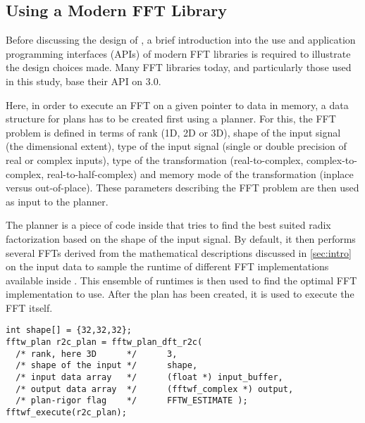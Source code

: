 \subsection{Using a Modern FFT Library}
\label{ssec:modern_ffts}
Before discussing the design of \gearshifft{}, a brief introduction into the use and application programming interfaces (APIs) of modern FFT libraries is required to illustrate the design choices made. Many FFT libraries today, and particularly those used in this study, base their API on \fftw{} $3.0$. 

Here, in order to execute an FFT on a given pointer to data in memory, a data structure for plans has to be created first using a planner. For this, the FFT problem is defined in terms of rank (1D, 2D or 3D), shape of the input signal (the dimensional extent), type of the input signal (single or double precision of real or complex inputs), type of the transformation (real-to-complex, complex-to-complex, real-to-half-complex) and memory mode of the transformation (inplace versus out-of-place). These parameters describing the FFT problem are then used as input to the planner. 

The planner is a piece of code inside \fftw{} that tries to find the best suited radix factorization based on the shape of the input signal. By default, it then performs several FFTs derived from the mathematical descriptions discussed in \cref{sec:intro} on the input data to sample the runtime of different FFT implementations available inside \fftw{}. This ensemble of runtimes is then used to find the optimal FFT implementation to use. After the plan has been created, it is used to execute the FFT itself.

\begin{lstlisting}[caption={Minimal usage example of the \fftw{} single precision real-to-complex planner API. Memory management is omitted.},label={lst:fftw_example}]
int shape[] = {32,32,32};
fftw_plan r2c_plan = fftw_plan_dft_r2c(
  /* rank, here 3D      */		3,                       
  /* shape of the input */		shape,                   
  /* input data array   */		(float *) input_buffer,  
  /* output data array  */		(fftwf_complex *) output,
  /* plan-rigor flag    */		FFTW_ESTIMATE );         
fftwf_execute(r2c_plan);
\end{lstlisting}

